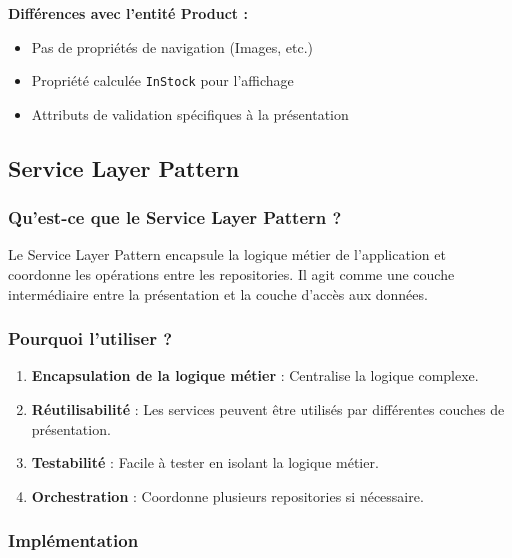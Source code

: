 \documentclass[12pt,a4paper]{article}
\begin{document}
\textbf{Différences avec l'entité Product :}
\begin{itemize}
    \item Pas de propriétés de navigation (Images, etc.)
    \item Propriété calculée \texttt{InStock} pour l'affichage
    \item Attributs de validation spécifiques à la présentation
\end{itemize}

\subsection{Service Layer Pattern}

\subsubsection{Qu'est-ce que le Service Layer Pattern ?}

Le Service Layer Pattern encapsule la logique métier de l'application et coordonne les opérations entre les repositories. Il agit comme une couche intermédiaire entre la présentation et la couche d'accès aux données.

\subsubsection{Pourquoi l'utiliser ?}

\begin{enumerate}
    \item \textbf{Encapsulation de la logique métier} : Centralise la logique complexe.
    \item \textbf{Réutilisabilité} : Les services peuvent être utilisés par différentes couches de présentation.
    \item \textbf{Testabilité} : Facile à tester en isolant la logique métier.
    \item \textbf{Orchestration} : Coordonne plusieurs repositories si nécessaire.
\end{enumerate}

\subsubsection{Implémentation}
\end{document}
